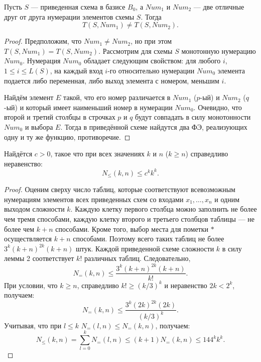 \begin{lemma}
    Пусть $S$ --- приведенная схема в базисе $B_0$, а $Num_1$ и $Num_2$ --- две отличные друг от друга нумерации элементов схемы $S$. Тогда
    \[
        T(S, Num_1) \neq T(S, Num_2).
    \]
\end{lemma}

\begin{proof}
    Предположим, что $Num_1 \neq Num_2$, но при этом $T(S, Num_1) = T(S, Num_2)$. Рассмотрим для схемы $S$ монотонную нумерацию $Num_0$.  Нумерация $Num_0$ обладает следующим свойством: для любого $i$, $1 \leqslant i \leqslant L(S)$, на каждый вход $i$-го относительно нумерации $Num_0$ элемента подается либо переменная, либо выход элемента с номером, меньшим $i$.

    Найдём элемент $E$ такой, что его номер различается в $Num_1$ ($p$-ый) и $Num_2$ ($q$-ый) и который имеет наименьший номер в нумерации $Num_0$. Очевидно, что второй и третий столбцы в строчках $p$ и $q$ будут совпадать в силу монотонности $Num_0$ и выбора $E$. Тогда в приведённой схеме найдутся два ФЭ, реализующих одну и ту же функцию, противоречие.
\end{proof}

\begin{lemma}
    Найдётся $c>0$, такое что при всех значениях $k$ и $n$ ($k \geqslant n$) справедливо неравенство:
    \[
        N_{\leqslant}(k,n)\leqslant c^k k^k.
    \]
\end{lemma}

\begin{proof}
    Оценим сверху число таблиц, которые соответствуют всевозможным нумерациям элементов всех приведенных схем со входами $x_1, \ldots, x_n$ и одним выходом сложности $k$. Каждую клетку первого столбца можно заполнить не более чем тремя способами, каждую клетку второго и третьего столбцов таблицы --- не более чем $k+n$ способами. Кроме того, выбор места для пометки $*$ осуществляется $k+n$ способами. Поэтому всего таких таблиц не более $3^k(k + n)^{2k}(k + n)$ штук. Каждой приведенной схеме сложности $k$ в силу леммы 2 соответствует $k!$ различных таблиц. Следовательно,
    \[
        N_=(k, n) \leqslant \frac{3^k(k+n)^{2k}(k+n)}{k!}.
    \]
    При условии, что $k\geqslant n$, справедливо $k!\geqslant (k/3)^k$ и неравенство $2k<2^k$, получаем:
    \[
        N_= (k, n) \leqslant \frac{3^k(2k)^{2k}(2k)}{(k/3)^k}.
    \]
    Учитывая, что при $l\leqslant k$ $N_=(l, n) \leqslant N_= (k, n)$, получаем:
    \[
        N_{\leqslant} (k, n) = \sum_{l=0}^k N_=(l,n) \leqslant (k+1) N_=(k, n) \leqslant 144^k k^k.
    \]
\end{proof}

